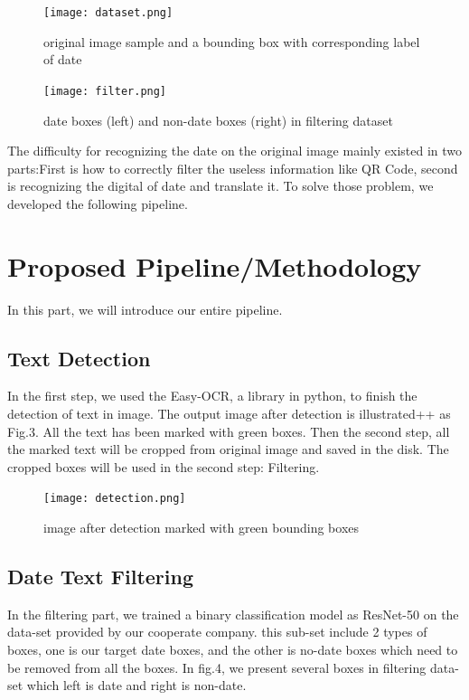 \documentclass{article}
\begin{document}
\begin{figure}[ht] \centering
	\label{dataset}
	\texttt{[image: dataset.png]}
	\caption{original image sample and a bounding box with corresponding label of date}
\end{figure}

\begin{figure}[ht] \centering
	\label{filtering}
	\texttt{[image: filter.png]}
	\caption{date boxes (left) and non-date boxes (right) in filtering dataset}
\end{figure}

The difficulty for recognizing the date on the original image mainly existed in two parts:First is how to correctly filter the useless information like QR Code, second is recognizing the digital of date and translate it. To solve those problem, we developed the following pipeline.

\section{Proposed Pipeline/Methodology}

In this part, we will introduce our entire pipeline.

\subsection{Text Detection}

In the first step, we used the Easy-OCR, a library in python, to finish the detection of text in image. The output image after detection is illustrated++ as Fig.3. All the text has been marked with green boxes. Then the second step, all the marked text will be cropped from original image and saved in the disk. The cropped boxes will be used in the second step: Filtering.

\begin{figure}[ht] \centering    
	\label{detection}     
	\texttt{[image: detection.png]}  
   
	\caption{image after detection marked with green bounding boxes}
\end{figure}

\subsection{Date Text Filtering}

In the filtering part, we trained a binary classification model as ResNet-50 on the data-set provided by our cooperate company. this sub-set include 2 types of boxes, one is our target date boxes, and the other is no-date boxes which need to be removed from all the boxes. In fig.4, we present several boxes in filtering data-set which left is date and right is non-date.
\end{document}

